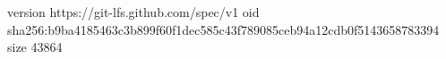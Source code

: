 version https://git-lfs.github.com/spec/v1
oid sha256:b9ba4185463c3b899f60f1dec585c43f789085ceb94a12cdb0f5143658783394
size 43864
